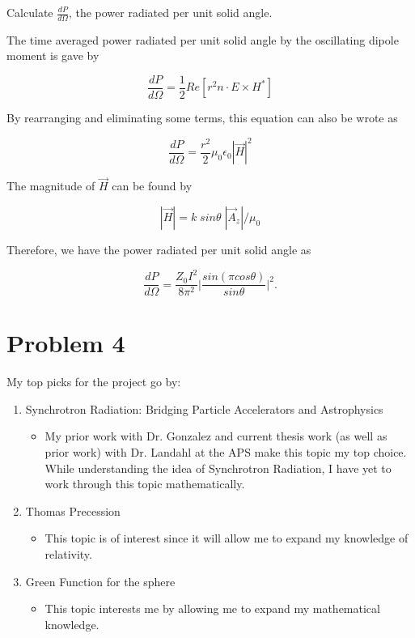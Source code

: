 \documentclass[11pt]{article}
\begin{document}
Calculate $\frac{dP}{d\Omega}$, the power radiated per unit solid angle. 

The time averaged power radiated per unit solid angle by the oscillating dipole moment is gave by

$$
\frac{dP}{d\Omega} = \frac{1}{2} Re[r^{2} n \cdot E \times H^{*}]
$$

By rearranging and eliminating some terms, this equation can also be wrote as

$$
\frac{dP}{d\Omega} = \frac{r^{2}}{2} \mu_{0} \epsilon_{0} |\vec{H}|^{2}
$$

The magnitude of $\vec{H}$ can be found by

$$
|\vec{H}| = k \; sin \theta \; |\vec{A}_{z} |/ \mu_{0}
$$

Therefore, we have the power radiated per unit solid angle as

$$
\frac{dP}{d\Omega} = \frac{Z_{0}I^{2}}{8\pi^{2}} \Bigg| \frac{sin(\pi cos \theta)}{sin \theta}  \Bigg|^{2}.
$$

\clearpage

\section*{Problem 4}

My top picks for the project go by:

\begin{enumerate}
  \item Synchrotron Radiation: Bridging Particle Accelerators and Astrophysics
     \begin{itemize}
     \item My prior work with Dr. Gonzalez and current thesis work (as well as prior work) with Dr. Landahl at the APS make this topic my top choice. While understanding the idea of Synchrotron Radiation, I have yet to work through this topic mathematically. 
   \end{itemize}
  \item Thomas Precession
     \begin{itemize}
     \item This topic is of interest since it will allow me to expand my knowledge of relativity. 
   \end{itemize}
  \item Green Function for the sphere
     \begin{itemize}
     \item This topic interests me by allowing me to expand my mathematical knowledge. 
   \end{itemize}
\end{enumerate}

\clearpage


%

\clearpage


\end{document}
